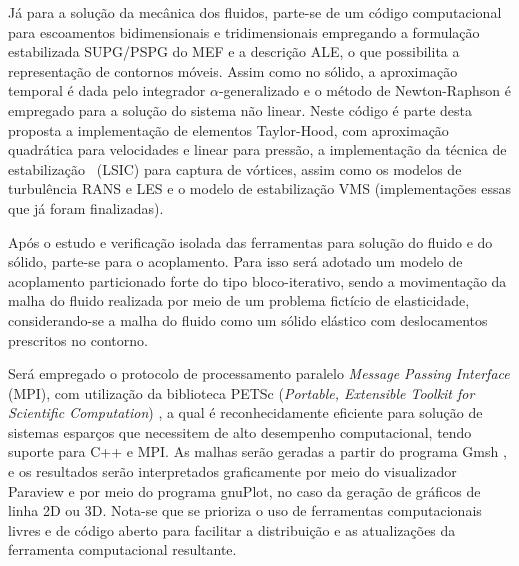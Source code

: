 Já para a solução da mecânica dos fluidos, parte-se de um código computacional para escoamentos bidimensionais e tridimensionais empregando a formulação estabilizada SUPG/PSPG do MEF e a descrição ALE, o que possibilita a representação de contornos móveis. Assim como no sólido, a aproximação temporal é dada pelo integrador $\alpha$-generalizado e o método de Newton-Raphson é empregado para a solução do sistema não linear. Neste código é parte desta proposta a implementação de elementos Taylor-Hood, com aproximação quadrática para velocidades e linear para pressão, a implementação da técnica de estabilização \LSIC\ (LSIC) para captura de vórtices, assim como os modelos de turbulência RANS e LES e o modelo de estabilização VMS (implementações essas que já foram finalizadas).

Após o estudo e verificação isolada das ferramentas para solução do fluido e do sólido, parte-se para o acoplamento.
Para isso será adotado um modelo de acoplamento particionado forte do tipo bloco-iterativo, sendo a movimentação da malha do fluido realizada por meio de um problema fictício de elasticidade, considerando-se a malha do fluido como um sólido elástico com deslocamentos prescritos no contorno.




Será empregado o protocolo de processamento paralelo \textit{Message Passing Interface} (MPI), com utilização da biblioteca PETSc (\textit{Portable, Extensible Toolkit for Scientific Computation}) \cite{petsc-web-page}, a qual é reconhecidamente eficiente para solução de sistemas esparços que necessitem de alto desempenho computacional, tendo suporte para C++ e MPI.  As malhas serão geradas a partir do programa Gmsh \cite{geuzaine2009gmsh}, e os resultados serão interpretados graficamente por meio do visualizador Paraview \cite{ahrens2005paraview} e por meio do programa gnuPlot, no caso da geração de gráficos de linha 2D ou 3D. Nota-se que se prioriza o uso de ferramentas computacionais livres e de código aberto para facilitar a distribuição e as atualizações da ferramenta computacional resultante.

